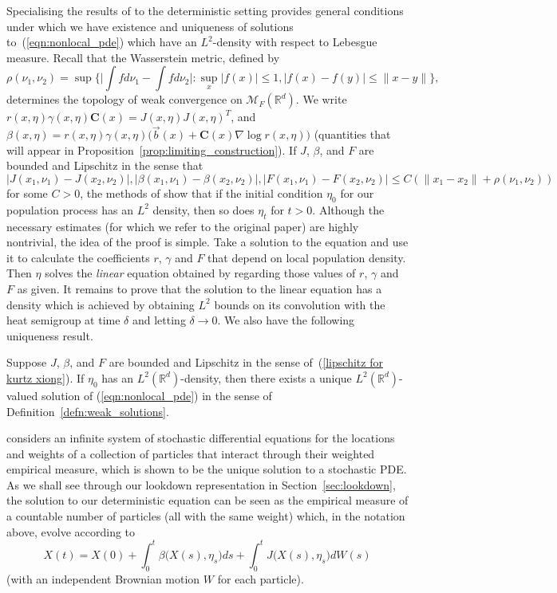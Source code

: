 \documentclass[EJP]{ejpecp} %
\newcommand{\IR}{\mathbb R}
\newcommand{\meanq}{\vec b}    %
\newcommand{\covq}{\mathbf{C}}     %
\newcommand{\measures}{\mathcal{M}_F(\IR^d)} %
\newcommand{\citet}[1]{\cite{#1}}
\begin{document}
Specialising the results of 
\citet{kurtz/xiong:1999} to the deterministic setting
provides general conditions under which we
have existence and uniqueness of solutions to~(\ref{eqn:nonlocal_pde}) which
have an $L^2$-density with respect to Lebesgue measure. 
Recall that the Wasserstein metric, defined by 
\[\rho (\nu_1,\nu_2)=\sup\Big\{\Big|\int fd\nu_1-\int fd\nu_2\Big|:\sup_x|f(x
)|\leq 1,|f(x)-f(y)|\leq \|x-y\|\Big\},\]
determines the topology of weak convergence on $\measures$.
We write 
$r(x,\eta) \gamma(x,\eta) \covq(x) = J(x,\eta) J(x,\eta)^T$, and 
$\beta(x,\eta) = r(x,\eta) \gamma(x,\eta) \big(\meanq(x)+\covq(x)\nabla\log r(x,\eta)\big)$
(quantities that will appear in Proposition~\ref{prop:limiting_construction}).
If $J$, $\beta$, and $F$ are bounded and Lipschitz in the sense 
that
\begin{equation}
\label{lipschitz for kurtz xiong}
|J (x_1, \nu_1)-J (x_2, \nu_2)|,|\beta (x_1,\nu_1)-\beta 
	(x_2,\nu_2)|, |F(x_1,\nu_1)-F(x_2,\nu_2)|
	\leq C(\|x_1-x_2\|+\rho (\nu_ 1,\nu_2))
\end{equation}
for some $C>0$,   
the methods of \citet{kurtz/xiong:1999} show that %
if the initial condition $\eta_0$ for our 
population process has
an $L^2$ density, then so does $\eta_t$ for $t>0$. 
Although the necessary estimates (for which we refer to the original paper)
are highly nontrivial, 
the idea of the proof is simple. Take a solution to the
equation and use it to calculate the coefficients $r$, $\gamma$ and $F$ that depend
on local population density. Then $\eta$ solves the 
{\em linear} equation obtained by regarding those values of $r$, $\gamma$ and $F$ as given.
It remains to prove that the solution to the linear equation has a density
which is achieved by obtaining
$L^2$ bounds on its convolution with the heat semigroup at time $\delta$ and letting 
$\delta\to 0$.
We also have the following uniqueness result.
\begin{theorem}[Special case of \citet{kurtz/xiong:1999}, Theorem~3.5]
	\label{thm:kurtzxiong}
Suppose  $J$, $\beta$, and $F$ are bounded and Lipschitz in the sense 
of~(\ref{lipschitz for kurtz xiong}).
If $\eta_0$ has an $L^2({\mathbb R}^d)$-density, then there 
exists a unique $L^2({\mathbb R}^d)$-valued  
	solution of (\ref{eqn:nonlocal_pde}) in the sense of 
	Definition~\ref{defn:weak_solutions}.
\end{theorem}
\begin{remark}
\citet{kurtz/xiong:1999} considers an infinite system of stochastic differential equations
for the locations and weights of a collection of particles that interact through their 
weighted empirical measure, which is shown to be the unique solution to a stochastic
	PDE. As we shall see through our lookdown representation in 
Section~\ref{sec:lookdown}, the
	solution to our
	deterministic equation can be seen as the empirical measure of a 
	countable number of particles (all with the same weight)
which, in the notation above, evolve according
	to 
	\[X(t)=X(0)+\int_0^t\beta\big(X(s), \eta_s\big)ds
+\int_0^tJ\big(X(s), \eta_s\big)dW(s)\]
	(with an independent Brownian motion $W$ for each particle).
\end{remark}
\end{document}
